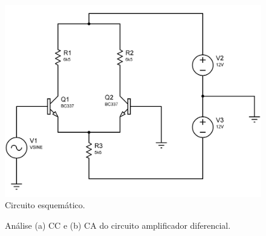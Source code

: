 \documentclass[a4paper,12pt,oneside,openany,table,xcdraw]{article}
\begin{document}
\vspace{0.5cm}
\begin{figure}[H]
\centering
\includegraphics[width=13cm]{sim-circuito}
\caption{Circuito esquemático.}
\label{sim:circuito}
\end{figure}

\begin{figure}[H]
\center
{}\hfill
{}
\caption{Análise (a) CC e (b) CA do circuito amplificador diferencial.}
\label{proc:analise}
\end{figure}
\vspace{0.5cm}
\end{document}
